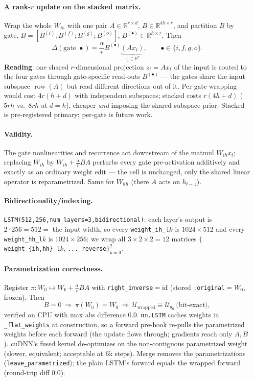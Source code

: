 \documentclass[11pt]{article}
\newcommand{\code}[1]{\texttt{#1}}
\newcommand{\row}{\operatorname{row}}
\begin{document}
\paragraph{A rank-$r$ update on the stacked matrix.} Wrap the whole $W_{ih}$ with one pair
$A\in\mathbb R^{r\times d}$, $B\in\mathbb R^{4h\times r}$, and partition $B$ by gate,
$B=[B^{(i)};B^{(f)};B^{(g)};B^{(o)}]$, $B^{(\bullet)}\in\mathbb R^{h\times r}$. Then
\[
\Delta(\text{gate }\bullet)=\frac{\alpha}{r}B^{(\bullet)}\underbrace{(Ax_t)}_{z_t\in\mathbb R^r},
\qquad\bullet\in\{i,f,g,o\}.
\]
\textbf{Reading}: one shared $r$-dimensional projection $z_t=Ax_t$ of the input is routed to
the four gates through gate-specific read-outs $B^{(\bullet)}$ --- the gates share the input
subspace $\row(A)$ but read different directions out of it. Per-gate wrapping would cost
$4r(h+d)$ with independent subspaces; stacked costs $r(4h+d)$ ($5rh$ vs.\ $8rh$ at $d=h$),
cheaper \emph{and} imposing the shared-subspace prior. Stacked is pre-registered primary;
per-gate is future work.

\paragraph{Validity.} The gate nonlinearities and recurrence act downstream of the matmul
$W_{ih}x_t$; replacing $W_{ih}$ by $W_{ih}+\frac{\alpha}{r}BA$ perturbs every gate
pre-activation additively and exactly as an ordinary weight edit --- the cell is unchanged,
only the shared linear operator is reparametrized. Same for $W_{hh}$ (there $A$ acts on
$h_{t-1}$).

\paragraph{Bidirectionality/indexing.} \code{LSTM(512,256,num\_layers=3,bidirectional)}: each
layer's output is $2\cdot256=512=$ the input width, so every \code{weight\_ih\_l}$k$ is
$1024\times512$ and every \code{weight\_hh\_l}$k$ is $1024\times256$; we wrap all
$3\times2\times2=12$ matrices $\{$\code{weight\_\{ih,hh\}\_l}$k$, \code{...\_reverse}$\}_{k=0}^2$.

\paragraph{Parametrization correctness.} Register $\pi:W_0\mapsto W_0+\frac{\alpha}{r}BA$ with
\code{right\_inverse}$=\mathrm{id}$ (stored \code{.original}$=W_0$, frozen). Then
\[
B=0\ \Longrightarrow\ \pi(W_0)=W_0\ \Longrightarrow\ \mathcal U_{\text{wrapped}}\equiv\mathcal U_{\theta_0}\ \text{(bit-exact)},
\]
verified on CPU with max abs difference $0.0$. \code{nn.LSTM} caches weights in
\code{\_flat\_weights} at construction, so a forward pre-hook re-pulls the parametrized
weights before each forward (the update flows through; gradients reach only $A,B$). cuDNN's
fused kernel de-optimizes on the non-contiguous parametrized weight (slower, equivalent;
acceptable at $6$k steps). Merge removes the parametrizations (\code{leave\_parametrized});
the plain LSTM's forward equals the wrapped forward (round-trip diff $0.0$).
\end{document}
